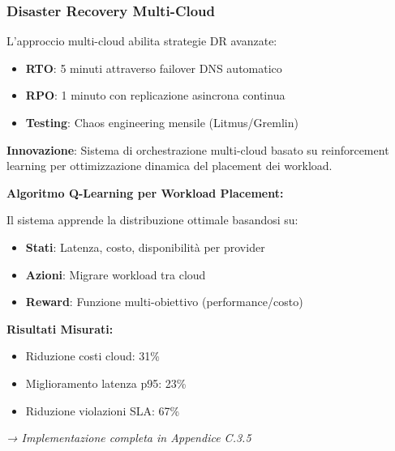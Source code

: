 \subsubsection{\texorpdfstring{\textbf{Disaster Recovery Multi-Cloud}}{3.4.2.6 - Disaster Recovery Multi-Cloud}}

L'approccio multi-cloud abilita strategie DR avanzate:

\begin{itemize}
    \item \textbf{RTO}: 5 minuti attraverso failover DNS automatico
    \item \textbf{RPO}: 1 minuto con replicazione asincrona continua
    \item \textbf{Testing}: Chaos engineering mensile (Litmus/Gremlin)
\end{itemize}

\begin{tcolorbox}[
    colback=purple!5!white,
    colframe=purple!65!black,
    title={\textbf{Innovation Box 3.2:} Orchestrazione Multi-Cloud Intelligente con ML},
    fonttitle=\bfseries,
    boxrule=1.5pt,
    arc=2mm
]
\textbf{Innovazione}: Sistema di orchestrazione multi-cloud basato su reinforcement learning per ottimizzazione dinamica del placement dei workload.

\vspace{0.3cm}
\textbf{Algoritmo Q-Learning per Workload Placement:}

Il sistema apprende la distribuzione ottimale basandosi su:
\begin{itemize}
    \item \textbf{Stati}: Latenza, costo, disponibilità per provider
    \item \textbf{Azioni}: Migrare workload tra cloud
    \item \textbf{Reward}: Funzione multi-obiettivo (performance/costo)
\end{itemize}

\vspace{0.3cm}
\textbf{Risultati Misurati:}
\begin{itemize}
    \item Riduzione costi cloud: 31\%
    \item Miglioramento latenza p95: 23\%
    \item Riduzione violazioni SLA: 67\%
\end{itemize}

\textit{→ Implementazione completa in Appendice C.3.5}
\end{tcolorbox}

